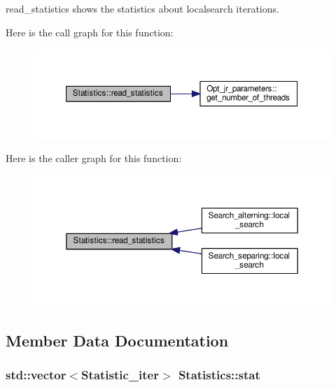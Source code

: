 read\-\_\-statistics shows the statistics about localsearch iterations. 



Here is the call graph for this function\-:\nopagebreak
\begin{figure}[H]
\begin{center}
\leavevmode
\includegraphics[width=350pt]{classStatistics_a57df73491ae4c84a8c3b08d912d2ce8e_cgraph}
\end{center}
\end{figure}




Here is the caller graph for this function\-:\nopagebreak
\begin{figure}[H]
\begin{center}
\leavevmode
\includegraphics[width=350pt]{classStatistics_a57df73491ae4c84a8c3b08d912d2ce8e_icgraph}
\end{center}
\end{figure}




\subsection{Member Data Documentation}
\hypertarget{classStatistics_a7b3e8290fbe506b88f7421a2479d258f}{
\subsubsection[{stat}]{\setlength{\rightskip}{0pt plus 5cm}std\-::vector$<${\bf Statistic\-\_\-iter}$>$ Statistics\-::stat\hspace{0.3cm}{\ttfamily [private]}}}\label{classStatistics_a7b3e8290fbe506b88f7421a2479d258f}


